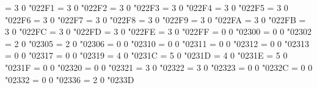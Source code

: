 \Umathchardef\ddots = 3 0 "022F1 %
\Umathchardef\disin = 3 0 "022F2 %
\Umathchardef\varisins = 3 0 "022F3 %
\Umathchardef\isins = 3 0 "022F4 %
\Umathchardef\isindot = 3 0 "022F5 %
\Umathchardef\varisinobar = 3 0 "022F6 %
\Umathchardef\isinobar = 3 0 "022F7 %
\Umathchardef\isinvb = 3 0 "022F8 %
\Umathchardef\isinE = 3 0 "022F9 %
\Umathchardef\nisd = 3 0 "022FA %
\Umathchardef\varnis = 3 0 "022FB %
\Umathchardef\nis = 3 0 "022FC %
\Umathchardef\varniobar = 3 0 "022FD %
\Umathchardef\niobar = 3 0 "022FE %
\Umathchardef\bagmember = 3 0 "022FF %
\Umathchardef\diameter = 0 0 "02300 %
\Umathchardef\house = 0 0 "02302 %
\Umathchardef\varbarwedge = 2 0 "02305 %
\Umathchardef\vardoublebarwedge = 2 0 "02306 %
\def\lceil{\Udelimiter 4 0 "02308 }
\def\rceil{\Udelimiter 5 0 "02309 }
\def\lfloor{\Udelimiter 4 0 "0230A }
\def\rfloor{\Udelimiter 5 0 "0230B }
\Umathchardef\invnot = 0 0 "02310 %
\Umathchardef\sqlozenge = 0 0 "02311 %
\Umathchardef\profline = 0 0 "02312 %
\Umathchardef\profsurf = 0 0 "02313 %
\Umathchardef\viewdata = 0 0 "02317 %
\Umathchardef\turnednot = 0 0 "02319 %
\Umathchardef\ulcorner = 4 0 "0231C %
\Umathchardef\urcorner = 5 0 "0231D %
\Umathchardef\llcorner = 4 0 "0231E %
\Umathchardef\lrcorner = 5 0 "0231F %
\Umathchardef\inttop = 0 0 "02320 %
\Umathchardef\intbottom = 0 0 "02321 %
\Umathchardef\frown = 3 0 "02322 %
\Umathchardef\smile = 3 0 "02323 %
\Umathchardef\varhexagonlrbonds = 0 0 "0232C %
\Umathchardef\conictaper = 0 0 "02332 %
\Umathchardef\topbot = 0 0 "02336 %
\Umathchardef\obar = 2 0 "0233D %

